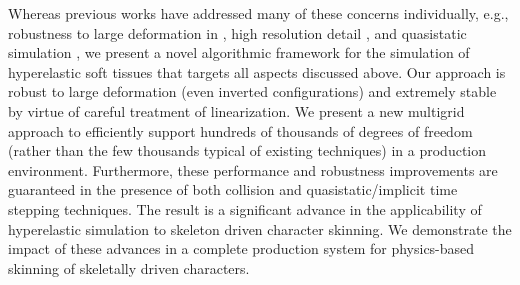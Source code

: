 
Whereas previous works have addressed many of these concerns individually, e.g., robustness to large deformation in \cite{irving:2004:invertible}, high resolution detail \cite{Zhu:2010:EMM}, and quasistatic simulation \cite{teran:2005:quasistatics},  we present a novel algorithmic framework for the simulation of hyperelastic soft tissues that targets all aspects discussed above. Our approach is robust to large deformation (even inverted configurations) and extremely stable by virtue of careful treatment of linearization. We present a new multigrid approach to efficiently support hundreds of thousands of degrees of freedom (rather than the few thousands typical of existing techniques) in a production environment. Furthermore, these performance and robustness improvements are guaranteed in the presence of both collision and quasistatic/implicit time stepping techniques. The result is a significant advance in the applicability of hyperelastic simulation to skeleton driven character skinning. We demonstrate the impact of these advances in a complete production system for physics-based skinning of skeletally driven characters. 




